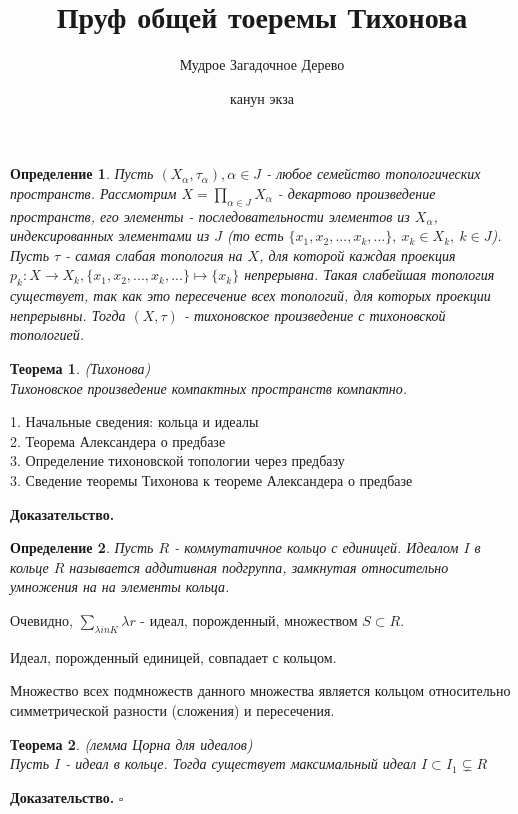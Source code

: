 \documentclass[a4paper]{article}
\author{Мудрое Загадочное Дерево}
\title{Пруф общей тоеремы Тихонова}
\date{канун экза}
\newtheorem{defin}{Определение}
\newtheorem{theor}{Теорема}
\begin{document}
\maketitle
\begin{defin}\label{tikhon}
Пусть $(X_\alpha,\tau_\alpha),\alpha\in J$ - любое семейство топологических
пространств. Рассмотрим
$X=\prod\limits_{\alpha\in J}X_\alpha$ 
- декартово произведение пространств, его элементы - последовательности
элементов из $X_\alpha$, индексированных элементами из $J$ (то есть
$\{x_1,x_2,...,x_k,...\},~x_k \in  X_k,~k \in  J$). 
Пусть $\tau$ - самая слабая топология на  $X$, для которой каждая
проекция $p_k\colon X\to X_k,\{x_1,x_2,...,x_k,...\}\mapsto \{x_k\}$ 
непрерывна. Такая слабейшая топология существует, 
так как это пересечение всех топологий, для которых проекции непрерывны. 
Тогда $(X,\tau)$ - тихоновское произведение с тихоновской
топологией. 
\end{defin}
\begin{theor}
    (Тихонова)\\
    Тихоновское произведение компактных пространств компактно. 
\end{theor}
1. Начальные сведения: кольца и идеалы \\
2. Теорема Александера о предбазе \\
3. Определение тихоновской топологии через предбазу \\
3. Сведение теоремы Тихонова к теореме Александера о предбазе 

\textbf{Доказательство.} 
\begin{defin}
Пусть $R$ - коммутатичное кольцо с единицей. Идеалом $I$ в кольце $R$
называется аддитивная подгруппа, замкнутая относительно умножения на 
на элементы кольца.
\end{defin}
Очевидно, $\sum\limits_{\lambda in K} \lambda r$ - идеал, порожденный, 
множеством $S\subset R$. 

Идеал, порожденный единицей, совпадает с кольцом. 

Множество всех подмножеств данного множества является кольцом
относительно симметрической разности (сложения) и пересечения. 

\begin{theor}
    (лемма Цорна для идеалов)\\
    Пусть $I$ - идеал в кольце. Тогда существует максимальный идеал
     $I\subset I_1\subsetneq R$
\end{theor}
\textbf{Доказательство.}  
$\square$ \\
\end{document}

